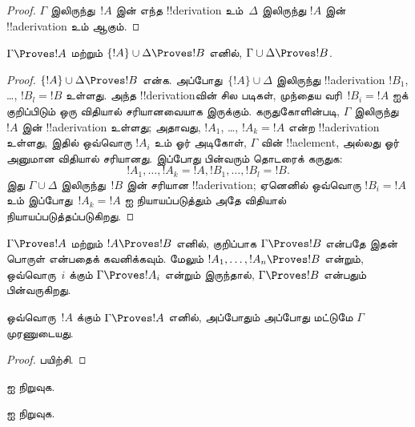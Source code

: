 \documentclass[../../../include/open-logic-section]{subfiles}
\begin{document}
\begin{proof}
$\Gamma$ இலிருந்து~$!A$ இன் எந்த !!{derivation} உம்~$\Delta$ இலிருந்து
$!A$ இன் !!a{derivation} உம் ஆகும்.
\end{proof}

\begin{prop}[கடப்புப் பண்பு]
$\Gamma \Proves !A$ மற்றும் $\{!A\} \cup \Delta \Proves
!B$ எனில், $\Gamma \cup \Delta \Proves !B$.
\end{prop}

\begin{proof}
  $\{!A\} \cup \Delta \Proves !B$ என்க. அப்போது~$\{!A\} \cup
  \Delta$ இலிருந்து !!a{derivation} $!B_1$, \dots, $!B_l = !B$ உள்ளது.
  அந்த !!{derivation}வின் சில படிகள், முந்தைய வரி~$!B_i = !A$ ஐக்
  குறிப்பிடும் ஒரு விதியால் சரியானவையாக இருக்கும். கருதுகோளின்படி,
  $\Gamma$ இலிருந்து~$!A$ இன் !!a{derivation} உள்ளது; அதாவது,
  $!A_1$, \dots, $!A_k = !A$ என்ற !!a{derivation} உள்ளது, இதில் ஒவ்வொரு
  $!A_i$ உம் ஓர் அடிகோள், $\Gamma$ வின் !!a{element}, அல்லது ஓர் அனுமான
  விதியால் சரியானது. இப்போது பின்வரும் தொடரைக் கருதுக:
  \[
  !A_1, \dots, !A_k = !A, !B_1, \dots, !B_l = !B.
  \]
  இது $\Gamma \cup \Delta$ இலிருந்து~$!B$ இன் சரியான !!a{derivation};
  ஏனெனில் ஒவ்வொரு $!B_i = !A$ உம் இப்போது~$!A_k = !A$ ஐ நியாயப்படுத்தும்
  அதே விதியால் நியாயப்படுத்தப்படுகிறது.
\end{proof}

$\Gamma \Proves !A$ மற்றும் $!A \Proves !B$ எனில், குறிப்பாக $\Gamma
\Proves !B$ என்பதே இதன் பொருள் என்பதைக் கவனிக்கவும். மேலும் $!A_1,
\dots, !A_n \Proves !B$ என்றும், ஒவ்வொரு~$i$ க்கும் $\Gamma \Proves !A_i$
என்றும் இருந்தால், $\Gamma \Proves !B$ என்பதும் பின்வருகிறது.

\begin{prop}
ஒவ்வொரு~$!A$ க்கும் $\Gamma \Proves !A$ எனில், அப்போதும் அப்போது மட்டுமே
$\Gamma$ முரணுடையது.
\end{prop}

\begin{proof}
பயிற்சி.
\end{proof}

\begin{prob}
 ஐ நிறுவுக.
\end{prob}
\tagendprob

\begin{prob}
 ஐ நிறுவுக.
\end{prob}
\tagendprob
\end{document}

